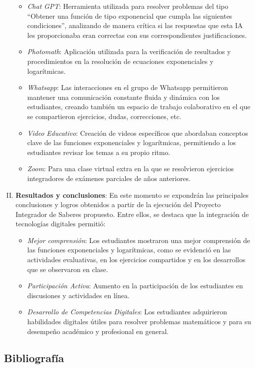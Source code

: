 \begin{enumerate}[I.]
\begin{itemize}
		\item \textit{Chat GPT}: Herramienta utilizada para resolver problemas del tipo “Obtener una función de tipo exponencial que cumpla las siguientes condiciones”, analizando de manera crítica si las respuestas que esta IA les proporcionaba eran correctas con sus correspondientes justificaciones.
		\item \textit{Photomath}: Aplicación utilizada para la verificación de resultados y procedimientos en la resolución de ecuaciones exponenciales y logarítmicas.
		\item \textit{Whatsapp}: Las interacciones en el grupo de Whatsapp permitieron mantener una comunicación constante fluida y dinámica con los estudiantes, creando también un espacio de trabajo colaborativo en el que se compartieron ejercicios, dudas, correcciones, etc.
		\item \textit{Video Educativo}: Creación de videos específicos que abordaban conceptos clave de las funciones exponenciales y logarítmicas, permitiendo a los estudiantes revisar los temas a su propio ritmo.
		\item \textit{Zoom}: Para una clase virtual extra en la que se resolvieron ejercicios integradores de exámenes parciales de años anteriores.
	\end{itemize}
	\item \textbf{Resultados y conclusiones}: En este momento se expondrán las principales conclusiones y logros obtenidos a partir de la ejecución del Proyecto Integrador de Saberes propuesto. Entre ellos, se destaca que la integración de tecnologías digitales permitió:
	\begin{itemize}
		\item \textit{Mejor comprensión}: Los estudiantes mostraron una mejor comprensión de las funciones exponenciales y logarítmicas, como se evidenció en las actividades evaluativas, en los ejercicios compartidos y en los desarrollos que se observaron en clase.
		\item \textit{Participación Activa}: Aumento en la participación de los estudiantes en discusiones y actividades en línea.
		\item \textit{Desarrollo de Competencias Digitales}: Los estudiantes adquirieron habilidades digitales útiles para resolver problemas matemáticos y para su desempeño académico y profesional en general.
	\end{itemize}
\end{enumerate}

\subsection{Bibliografía}

\nocite{*}
\printbibliography[keyword={12}]